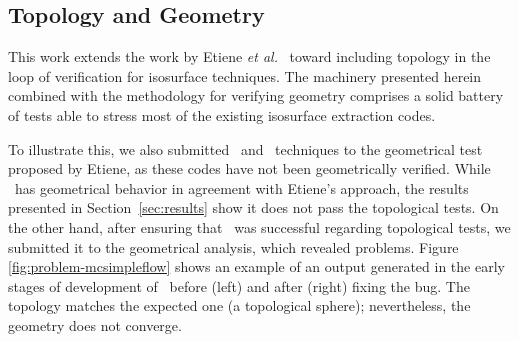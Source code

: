 \subsection{Topology and Geometry}
This work extends the work by Etiene \emph{et al.}~\cite{etiene:tvcg:2009} toward
including topology in the loop of verification for isosurface techniques. 
The machinery presented herein combined with the methodology for verifying
geometry comprises a solid battery of tests able to stress most of the existing 
isosurface extraction codes. 

To illustrate this, we also submitted \mclewiner\ and \mcsimpleflow\ techniques 
to the geometrical test proposed by Etiene, as these codes have not been 
geometrically verified. While \mclewiner\ has geometrical
behavior in agreement with Etiene's approach, the results presented in Section~\ref{sec:results} 
show it does not pass the topological tests. 
On the other hand, after ensuring that 
\mcsimpleflow\ was successful regarding topological tests, 
we submitted it to the geometrical analysis, which revealed problems.
Figure \ref{fig:problem-mcsimpleflow} shows an
example of an output generated in the early stages of development of \mcsimpleflow\ before (left) and after
(right) fixing the bug. The topology matches the expected one (a
topological sphere); nevertheless, the geometry does not converge. 



